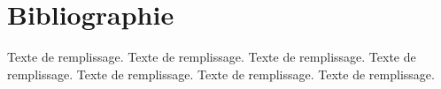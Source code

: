 \section{Bibliographie}

Texte de remplissage.
\autocite[Sur cette question, voir][p. 300]{dirac}
Texte de remplissage.
\autocite[p. 31]{einstein}
Texte de remplissage.
\autocite[p. 30]{dirac}
Texte de remplissage.
\autocite{einstein}
Texte de remplissage.
\autocite{knuthwebsite}
Texte de remplissage.
\autocite{sirinelli}
Texte de remplissage.





\printbibliography








% 
% 
% 
% 










